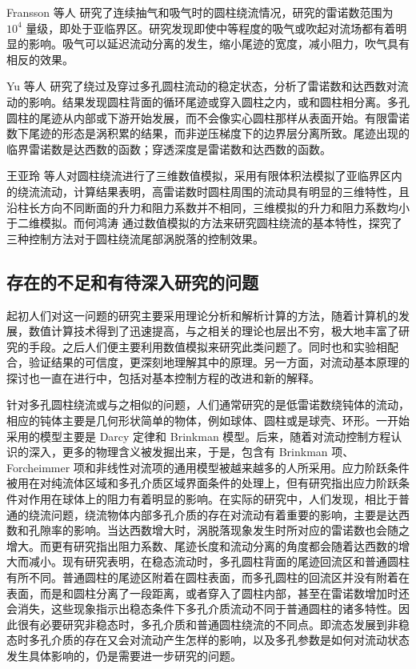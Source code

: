 Fransson 等人 \cite{fransson2004flow} 研究了连续抽气和吸气时的圆柱绕流情况，研究的雷诺数范围为 $10^4$ 量级，即处于亚临界区。研究发现即使中等程度的吸气或吹起对流场都有着明显的影响。吸气可以延迟流动分离的发生，缩小尾迹的宽度，减小阻力，吹气具有相反的效果。

Yu 等人 \cite{Yu2010} 研究了绕过及穿过多孔圆柱流动的稳定状态，分析了雷诺数和达西数对流动的影响。结果发现圆柱背面的循环尾迹或穿入圆柱之内，或和圆柱相分离。多孔圆柱的尾迹从内部或下游开始发展，而不会像实心圆柱那样从表面开始。有限雷诺数下尾迹的形态是涡积累的结果，而非逆压梯度下的边界层分离所致。尾迹出现的临界雷诺数是达西数的函数；穿透深度是雷诺数和达西数的函数。

王亚玲 \cite{王亚玲2001圆柱绕流的三维数值模拟} 等人对圆柱绕流进行了三维数值模拟，采用有限体积法模拟了亚临界区内的绕流流动，计算结果表明，高雷诺数时圆柱周围的流动具有明显的三维特性，且沿柱长方向不同断面的升力和阻力系数并不相同，三维模拟的升力和阻力系数均小于二维模拟。而何鸿涛 \cite{何鸿涛2009圆柱绕流及其控制的数值模拟研究} 通过数值模拟的方法来研究圆柱绕流的基本特性，探究了三种控制方法对于圆柱绕流尾部涡脱落的控制效果。

\subsection{存在的不足和有待深入研究的问题}

起初人们对这一问题的研究主要采用理论分析和解析计算的方法，随着计算机的发展，数值计算技术得到了迅速提高，与之相关的理论也层出不穷，极大地丰富了研究的手段。之后人们便主要利用数值模拟来研究此类问题了。同时也和实验相配合，验证结果的可信度，更深刻地理解其中的原理。另一方面，对流动基本原理的探讨也一直在进行中，包括对基本控制方程的改进和新的解释。

针对多孔圆柱绕流或与之相似的问题，人们通常研究的是低雷诺数绕钝体的流动，相应的钝体主要是几何形状简单的物体，例如球体、圆柱或是球壳、环形。一开始采用的模型主要是 Darcy 定律和 Brinkman 模型。后来，随着对流动控制方程认识的深入，更多的物理含义被发掘出来，于是，包含有 Brinkman 项、Forcheimmer 项和非线性对流项的通用模型被越来越多的人所采用。应力阶跃条件被用在对纯流体区域和多孔介质区域界面条件的处理上，但有研究指出应力阶跃条件对作用在球体上的阻力有着明显的影响。在实际的研究中，人们发现，相比于普通的绕流问题，绕流物体内部多孔介质的存在对流动有着重要的影响，主要是达西数和孔隙率的影响。当达西数增大时，涡脱落现象发生时所对应的雷诺数也会随之增大。而更有研究指出阻力系数、尾迹长度和流动分离的角度都会随着达西数的增大而减小。现有研究表明，在稳态流动时，多孔圆柱背面的尾迹回流区和普通圆柱有所不同。普通圆柱的尾迹区附着在圆柱表面，而多孔圆柱的回流区并没有附着在表面，而是和圆柱分离了一段距离，或者穿入了圆柱内部，甚至在雷诺数增加时还会消失，这些现象指示出稳态条件下多孔介质流动不同于普通圆柱的诸多特性。因此很有必要研究非稳态时，多孔介质和普通圆柱绕流的不同点。即流态发展到非稳态时多孔介质的存在又会对流动产生怎样的影响，以及多孔参数是如何对流动状态发生具体影响的，仍是需要进一步研究的问题。

